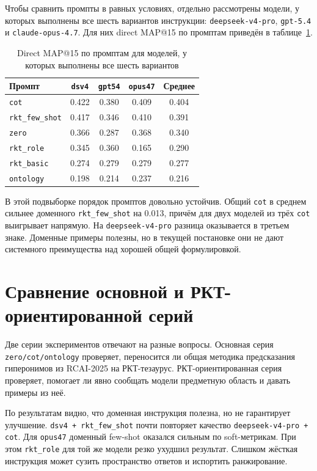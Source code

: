 \documentclass[12pt,a4paper,oneside,openany]{report}
\begin{document}
Чтобы сравнить промпты в равных условиях, отдельно рассмотрены модели, у которых выполнены все шесть вариантов инструкции: \texttt{deepseek-v4-pro}, \texttt{gpt-5.4} и \texttt{claude-opus-4.7}. Для них direct MAP@15 по промптам приведён в таблице~\ref{tab:prompts_h2h}.

\begin{table}[H]
\centering
\caption{Direct MAP@15 по промптам для моделей, у которых выполнены все шесть вариантов}
\label{tab:prompts_h2h}
\begin{tabular}{lcccc}
\toprule
Промпт & \texttt{dsv4} & \texttt{gpt54} & \texttt{opus47} & Среднее \\
\midrule
\texttt{cot}            & 0.422 & 0.380 & 0.409 & 0.404 \\
\texttt{rkt\_few\_shot} & 0.417 & 0.346 & 0.410 & 0.391 \\
\texttt{zero}           & 0.366 & 0.287 & 0.368 & 0.340 \\
\texttt{rkt\_role}      & 0.345 & 0.360 & 0.165 & 0.290 \\
\texttt{rkt\_basic}     & 0.274 & 0.279 & 0.279 & 0.277 \\
\texttt{ontology}       & 0.198 & 0.214 & 0.237 & 0.216 \\
\bottomrule
\end{tabular}
\end{table}

В этой подвыборке порядок промптов довольно устойчив. Общий \texttt{cot} в среднем сильнее доменного \texttt{rkt\_few\_shot} на 0.013, причём для двух моделей из трёх \texttt{cot} выигрывает напрямую. На \texttt{deepseek-v4-pro} разница оказывается в третьем знаке. Доменные примеры полезны, но в текущей постановке они не дают системного преимущества над хорошей общей формулировкой.

\section{Сравнение основной и РКТ-ориентированной серий}

Две серии экспериментов отвечают на разные вопросы. Основная серия \texttt{zero/cot/ontology} проверяет, переносится ли общая методика предсказания гиперонимов из RCAI-2025 на РКТ-тезаурус. РКТ-ориентированная серия проверяет, помогает ли явно сообщать модели предметную область и давать примеры из неё.

По результатам видно, что доменная инструкция полезна, но не гарантирует улучшение. \texttt{dsv4 + rkt\_few\_shot} почти повторяет качество \texttt{deepseek-v4-pro + cot}. Для \texttt{opus47} доменный few-shot оказался сильным по soft-метрикам. При этом \texttt{rkt\_role} для той же модели резко ухудшил результат. Слишком жёсткая инструкция может сузить пространство ответов и испортить ранжирование.
\end{document}
